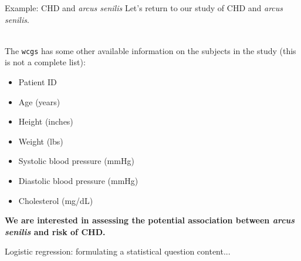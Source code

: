 \documentclass[10pt,t]{beamer}
\begin{document}
\begin{frame}{Example: CHD and \textit{arcus senilis}}
	Let's return to our study of CHD and \textit{arcus senilis}.
	\\ ~\
	
	The \texttt{wcgs} has some other available information on the subjects in the study (this is not a complete list):
	\begin{itemize}
		\item Patient ID
		\item Age (years)
		\item Height (inches)
		\item Weight (lbs)
		\item Systolic blood pressure (mmHg)
		\item Diastolic blood pressure (mmHg)
		\item Cholesterol (mg/dL)
	\end{itemize}  

	\textbf{We are interested in assessing the potential association between \textit{arcus senilis} and risk of CHD.} 
\end{frame}

\begin{frame}{Logistic regression: formulating a statistical question}
	content...
\end{frame}


\end{document}
